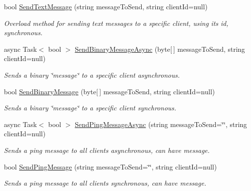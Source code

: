 \begin{DoxyCompactItemize}
bool \mbox{\hyperlink{class_simple_web_socket_server_library_1_1_simple_web_socket_server_a4ea5479402f769e2e73a8bcc06b654b1}{Send\+Text\+Message}} (string message\+To\+Send, string client\+Id=null)
\begin{DoxyCompactList}\small\item\em Overload method for sending text messages to a specific client, using it\textquotesingle{}s id, synchronous. \end{DoxyCompactList}\item 
async Task$<$ bool $>$ \mbox{\hyperlink{class_simple_web_socket_server_library_1_1_simple_web_socket_server_a9d94bdf3e2964c65cafc62a80102a28c}{Send\+Binary\+Message\+Async}} (byte\mbox{[}$\,$\mbox{]} message\+To\+Send, string client\+Id=null)
\begin{DoxyCompactList}\small\item\em Sends a binary \char`\"{}message\char`\"{} to a specific client asynchronous. \end{DoxyCompactList}\item 
bool \mbox{\hyperlink{class_simple_web_socket_server_library_1_1_simple_web_socket_server_ac6ddccc7dd4b54d16721d2dca025dc58}{Send\+Binary\+Message}} (byte\mbox{[}$\,$\mbox{]} message\+To\+Send, string client\+Id=null)
\begin{DoxyCompactList}\small\item\em Sends a binary \char`\"{}message\char`\"{} to a specific client synchronous. \end{DoxyCompactList}\item 
async Task$<$ bool $>$ \mbox{\hyperlink{class_simple_web_socket_server_library_1_1_simple_web_socket_server_a7f0eca90a424040685527ac873c31229}{Send\+Ping\+Message\+Async}} (string message\+To\+Send=\char`\"{}\char`\"{}, string client\+Id=null)
\begin{DoxyCompactList}\small\item\em Sends a ping message to all clients asynchronous, can have message. \end{DoxyCompactList}\item 
bool \mbox{\hyperlink{class_simple_web_socket_server_library_1_1_simple_web_socket_server_ab47f01467513ad98f0d9de69d41e12a5}{Send\+Ping\+Message}} (string message\+To\+Send=\char`\"{}\char`\"{}, string client\+Id=null)
\begin{DoxyCompactList}\small\item\em Sends a ping message to all clients synchronous, can have message. \end{DoxyCompactList}\item 

\end{DoxyCompactItemize}
